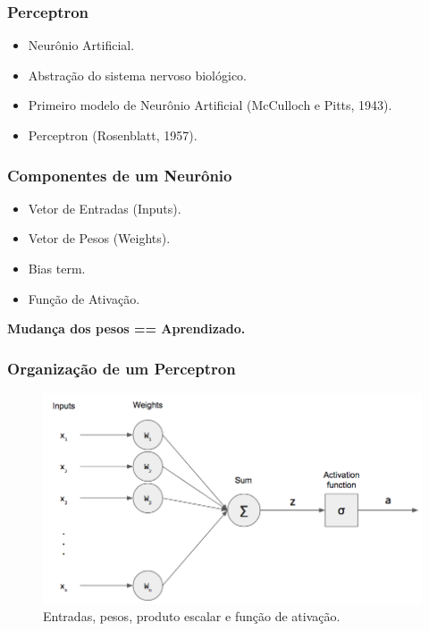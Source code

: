 \documentclass{beamer}
\begin{document}
\begin{frame}
\frametitle{Perceptron}
    \begin{itemize}
        \item Neurônio Artificial.
        \item Abstração do sistema nervoso biológico.
        \item Primeiro modelo de Neurônio Artificial (McCulloch e Pitts, 1943).
        \item Perceptron (Rosenblatt, 1957).
    \end{itemize}
\end{frame}


\begin{frame}
\frametitle{Componentes de um Neurônio}
\begin{itemize}
    \item Vetor de Entradas (Inputs).
    \item Vetor de Pesos (Weights).
    \item Bias term.
    \item Função de Ativação.
\end{itemize}

    \vspace{10px}

\textbf{Mudança dos pesos == Aprendizado.}

\end{frame}

\begin{frame}
\frametitle{Organização de um Perceptron}
\begin{figure}
\includegraphics[width=0.8\linewidth]{images/perceptron}
\caption{Entradas, pesos, produto escalar e função de ativação.}
\end{figure}
\end{frame}
\end{document}

